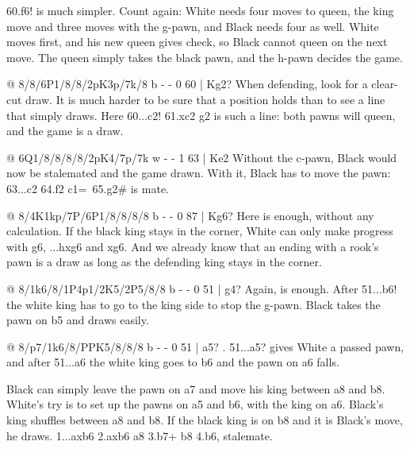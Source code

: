 60.\K f6! is much simpler. Count again: White needs four moves to queen, the king move and three
moves with the g-pawn, and Black needs four as well. White moves first, and his new queen gives
check, so Black cannot queen on the next move. The queen simply takes the black pawn, and the
h-pawn decides the game.

@ 8/8/6P1/8/8/2pK3p/7k/8 b - - 0 60 | Kg2?
When defending, look for a clear-cut draw. It is much harder to be sure that a position holds
than to see a line that simply draws. Here 60...c2!
61.\K xc2 \K g2 is such a line: both pawns will queen, and the game is a draw.

@ 6Q1/8/8/8/8/2pK4/7p/7k w - - 1 63 | Ke2
Without the c-pawn, Black would now be stalemated and the game drawn. With it, Black has to move
the pawn: 63...c2 64.\K f2 c1=\Q\ 65.\Q g2\# is mate.

@ 8/4K1kp/7P/6P1/8/8/8/8 b - - 0 87 | Kg6?
Here  is enough, without any
calculation. If the black king stays in the corner, White can only make progress with g6,
...hxg6 and \K xg6. And we already know that an ending with a rook's pawn is a draw as long as
the defending king stays in the corner.

@ 8/1k6/8/1P4p1/2K5/2P5/8/8 b - - 0 51 | g4?
Again,  is enough. After 51...\K b6! the white king has to go to the king side to stop the
g-pawn. Black takes the pawn on b5 and draws easily.

@ 8/p7/1k6/8/PPK5/8/8/8 b - - 0 51 | a5?
. 51...a5? gives White a passed pawn, and after 51...a6 the white
king goes to b6 and the pawn on a6 falls.

Black can simply leave the pawn on a7 and move his king between a8 and b8.
White's try is to set up the pawns on a5 and b6, with the king on a6. Black's king shuffles
between a8 and b8. If the black king is on b8 and it is Black's move, he draws.
1...axb6 2.axb6 \K a8 3.b7+ \K b8 4.\K b6, stalemate.


